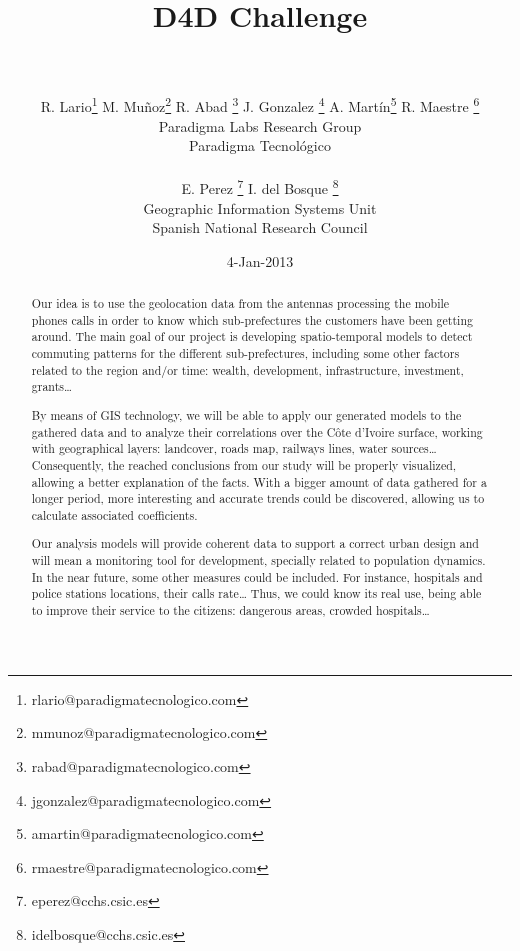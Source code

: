 \documentclass[a4paper,11pt]{article}
\begin{document}
\title{{\huge D4D Challenge} \\  \\ }

\author{{
				R. Lario\footnote{rlario@paradigmatecnologico.com} 
				M. Muñoz\footnote{mmunoz@paradigmatecnologico.com} 
				R. Abad \footnote{rabad@paradigmatecnologico.com} 
				J. Gonzalez \footnote{jgonzalez@paradigmatecnologico.com} 
				A. Martín\footnote{amartin@paradigmatecnologico.com} 
				R. Maestre \footnote{rmaestre@paradigmatecnologico.com} 
				\\\small Paradigma Labs Research Group \\\small Paradigma Tecnológico\\ \\
				E. Perez \footnote{eperez@cchs.csic.es} 
				I. del Bosque \footnote{idelbosque@cchs.csic.es} 
				\\\small Geographic Information Systems Unit \\\small Spanish National Research Council
				}}

\date{4-Jan-2013}
\maketitle

\begin{abstract} 
Our idea is to use the geolocation data from the antennas processing the mobile phones calls in order to know which sub-prefectures the customers have been getting around. The main goal of our project is developing spatio-temporal models to detect commuting patterns for the different sub-prefectures, including some other factors related to the region and/or time: wealth, development, infrastructure, investment, grants…

By means of GIS technology, we will be able to apply our generated models to the gathered data and to analyze their correlations over the Côte d’Ivoire surface, working with geographical layers: landcover, roads map, railways lines, water sources… Consequently, the reached conclusions from our study will be properly visualized, allowing a better explanation of the facts. With a bigger amount of data gathered for a longer period, more interesting and accurate trends could be discovered, allowing us to calculate associated coefficients.

Our analysis models will provide coherent data to support a correct urban design and will mean a monitoring tool for development, specially related to population dynamics.
In the near future, some other measures could be included. For instance, hospitals and police stations locations, their calls rate… Thus, we could know its real use, being able to improve their service to the citizens: dangerous areas, crowded hospitals…
\end{abstract}
\end{document}

